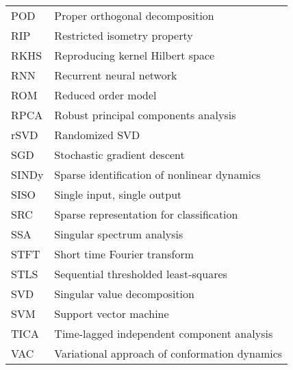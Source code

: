 \begin{table}[h]
\begin{center}
\begin{tabular}{|p{4.0cm}|p{12.0cm}|}
POD  & Proper orthogonal decomposition \\
RIP  & Restricted isometry property \\
RKHS  & Reproducing kernel Hilbert space \\
RNN  & Recurrent neural network \\
ROM  & Reduced order model \\
RPCA  & Robust principal components analysis \\
rSVD  & Randomized SVD \\
SGD  & Stochastic gradient descent \\
SINDy  & Sparse identification of nonlinear dynamics \\
SISO  & Single input, single output \\
SRC  & Sparse representation for classification \\
SSA  & Singular spectrum analysis \\
STFT  & Short time Fourier transform \\
STLS  & Sequential thresholded least-squares \\
SVD  & Singular value decomposition \\
SVM  & Support vector machine \\
TICA  & Time-lagged independent component analysis \\
VAC  & Variational approach of conformation dynamics \\
\hline
\end{tabular}
\end{center}
\end{table}
